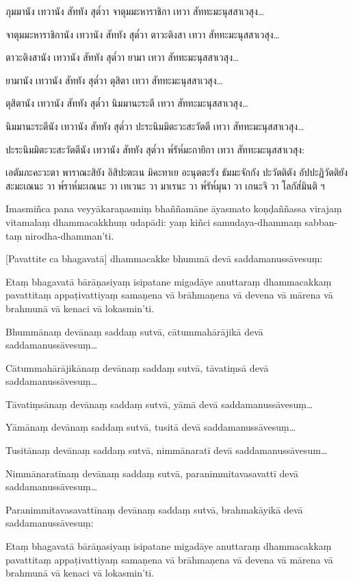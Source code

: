 \documentclass[
  babelLanguage=thai,
  final,
]{chantingbook}
\begin{document}
ภุมมานัง เทวานัง สัททัง สุต๎วา จาตุมมะหาราชิกา เทวา สัททะมะนุสสาเวสุง\ldots
 
จาตุมมะหาราชิกานัง เทวานัง สัททัง สุต๎วา ตาวะติงสา เทวา สัททะมะนุสสาเวสุง\ldots
 
ตาวะติงสานัง เทวานัง สัททัง สุต๎วา ยามา เทวา สัททะมะนุสสาเวสุง\ldots

ยามานัง เทวานัง สัททัง สุต๎วา ตุสิตา เทวา สัททะมะนุสสาเวสุง\ldots

ตุสิตานัง เทวานัง สัททัง สุต๎วา นิมมานะระตี เทวา สัททะมะนุสสาเวสุง\ldots

นิมมานะระตีนัง เทวานัง สัททัง สุต๎วา ปะระนิมมิตะวะสะวัตตี เทวา สัททะมะนุสสาเวสุง\ldots

ปะระนิมมิตะวะสะวัตตีนัง เทวานัง สัททัง สุต๎วา พ๎รัห๎มะกายิกา เทวา สัททะมะนุสสาเวสุง:

เอตัมภะคะวะตา พาราณะสิยัง อิสิปะตะเน มิคะทาเย
อะนุตตะรัง ธัมมะจักกัง ปะวัตติตัง อัปปะฏิวัตติยัง สะมะเณนะ วา
พ๎ราห๎มะเณนะ วา เทเวนะ วา มาเรนะ วา พ๎รัห๎มุนา วา เกนะจิ วา โลกัส๎มินติ ฯ

\clearpage

\paliText
\markboth{\paliTitle}{\rightmark}

Imasmiñca pana veyyākaraṇasmiṃ bhaññamāne āyasmato koṇḍaññassa virajaṃ
vītamalaṃ dhammacakkhuṃ udapādi: yaṃ kiñci samudaya-dhammaṃ sabban-taṃ
nirodha-dhamman'ti.

[Pavattite ca bhagavatā] dhammacakke bhummā devā saddamanussāvesuṃ:

Etaṃ bhagavatā bārāṇasiyaṃ isipatane migadāye anuttaraṃ dhammacakkaṃ
pavattitaṃ appaṭivattiyaṃ samaṇena vā brāhmaṇena vā devena vā mārena vā
brahmunā vā kenaci vā lokasmin'ti.

Bhummānaṃ devānaṃ saddaṃ sutvā, cātummahārājikā devā
saddamanussāvesuṃ\ldots

Cātummahārājikānaṃ devānaṃ saddaṃ sutvā, tāvatiṃsā devā
saddamanussāvesuṃ\ldots

Tāvatiṃsānaṃ devānaṃ saddaṃ sutvā, yāmā devā saddamanussāvesuṃ\ldots

Yāmānaṃ devānaṃ saddaṃ sutvā, tusitā devā saddamanussāvesuṃ\ldots

Tusitānaṃ devānaṃ saddaṃ sutvā, nimmānaratī devā saddamanussāvesum\ldots

Nimmānaratīnaṃ devānaṃ saddaṃ sutvā, paranimmitavasavattī devā
saddamanussāvesuṃ\ldots

Paranimmitavasavattīnaṃ devānaṃ saddaṃ sutvā, brahmakāyikā devā
saddamanussāvesuṃ:

Etaṃ bhagavatā bārāṇasiyaṃ isipatane migadāye anuttaraṃ dhammacakkaṃ
pavattitaṃ appaṭivattiyaṃ samaṇena vā brāhmaṇena vā devena vā mārena vā
brahmunā vā kenaci vā lokasmin'ti.
\end{document}
